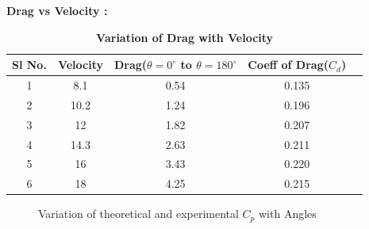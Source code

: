 \documentclass[12pt,a4paper]{article}
\begin{document}
\newpage

\textbf{Drag vs Velocity : } 



\begin{table}[ht]
\centering
\caption{\textbf{Variation of Drag with Velocity}}
\vspace{2mm}

\begin{tabular}{|c|c|c|c|c|} 
 \hline
Sl No. & Velocity & Drag($\theta = 0^{\circ}$ to $\theta = 180^{\circ}$ & Coeff of Drag($C_d$) \\ [0.1ex] 
 \hline \hline
1 & 8.1 & 0.54 & 0.135   \\ 
 \hline
2 & 10.2 & 1.24 & 0.196  \\
 \hline
3 & 12 & 1.82 & 0.207   \\
 \hline
4 & 14.3 & 2.63 & 0.211   \\
 \hline
5 & 16 & 3.43 & 0.220  \\
 \hline
6 & 18 & 4.25 & 0.215 \\ 
 \hline


\end{tabular}
\end{table}


\begin{figure}[!ht]
	\begin{center}
	\end{center}
	\caption{Variation of theoretical and experimental $C_p$ with Angles}
\end{figure}

\newpage
\end{document}
